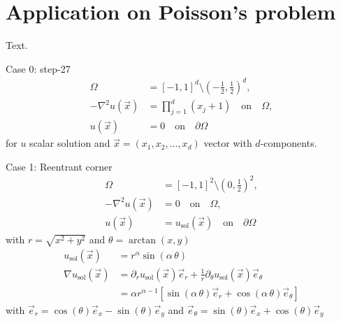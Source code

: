 \chapter{Application on Poisson's problem}
\label{ch:results}
Text.

Case 0: step-27
\begin{align}
  \Omega &= [-1,1]^d \setminus \left(-\frac{1}{2}, \frac{1}{2}\right)^d ,\\
  - \nabla^2 u(\vec{x}) &= \prod\limits_{j=1}^{d} (x_j + 1) \quad\text{on}\quad \Omega,\\
  u(\vec{x}) &= 0 \quad\text{on}\quad \partial\Omega
\end{align}
for $u$ scalar solution and $\vec{x} = (x_1, x_2, \dots, x_d)$ vector with $d$-components.


Case 1: Reentrant corner
\begin{align}
  \Omega &= [-1,1]^2 \setminus (0,\frac{1}{2})^2 ,\\
  - \nabla^2 u(\vec{x}) &= 0 \quad\text{on}\quad \Omega,\\
  u(\vec{x}) &= u_\text{sol}(\vec{x}) \quad\text{on}\quad \partial\Omega
\end{align}
with \(r = \sqrt{x^2 + y^2}\) and \(\theta = \arctan(x,y) \)
\begin{align}
  u_\text{sol}(\vec{x}) &= r^\alpha \sin(\alpha \, \theta) \\
  \nabla u_\text{sol}(\vec{x}) &= \partial_r u_\text{sol}(\vec{x}) \vec{e}_r + \frac{1}{r} \partial_\theta u_\text{sol}(\vec{x}) \vec{e}_\theta \\
  &= \alpha r^{\alpha - 1} \left[ \sin(\alpha \, \theta) \vec{e}_r + \cos(\alpha \, \theta) \vec{e}_\theta \right]
\end{align}
with \(\vec{e}_r = \cos(\theta) \vec{e}_x - \sin(\theta) \vec{e}_y\) and \(\vec{e}_\theta = \sin(\theta) \vec{e}_x + \cos(\theta) \vec{e}_y\)




